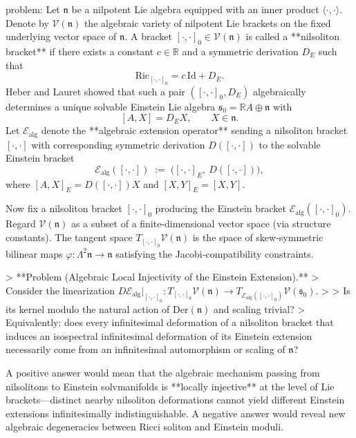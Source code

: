 problem:  
Let \( \mathfrak{n} \) be a nilpotent Lie algebra equipped with an inner product \( \langle \cdot,\cdot\rangle \).  
Denote by \( \mathcal{V}(\mathfrak{n}) \) the algebraic variety of nilpotent Lie brackets on the fixed underlying vector space of \( \mathfrak{n} \).  A bracket \( [\cdot,\cdot]_0 \in \mathcal{V}(\mathfrak{n}) \) is called a **nilsoliton bracket** if there exists a constant \( c\in\mathbb R \) and a symmetric derivation \(D_E\) such that
\[
\mathrm{Ric}_{[\cdot,\cdot]_0} = c\,\mathrm{Id} + D_E .
\]
Heber and Lauret showed that such a pair \(([\cdot,\cdot]_0, D_E)\) algebraically determines a unique solvable Einstein Lie algebra \( \mathfrak{s}_0 = \mathbb R A \oplus \mathfrak{n} \) with
\[
[A,X] = D_E X, \qquad X\in\mathfrak{n}.
\]
Let \( \mathcal{E}_{\mathrm{alg}} \) denote the **algebraic extension operator** sending a nilsoliton bracket \( [\cdot,\cdot] \) with corresponding symmetric derivation \(D([\cdot,\cdot])\) to the solvable Einstein bracket
\[
\mathcal{E}_{\mathrm{alg}}([\cdot,\cdot])\;:=\;\big([\cdot,\cdot]_E,\ D([\cdot,\cdot])\big),
\]
where \( [A,X]_E = D([\cdot,\cdot])X \) and \( [X,Y]_E = [X,Y] \).

Now fix a nilsoliton bracket \( [\cdot,\cdot]_0 \) producing the Einstein bracket \( \mathcal{E}_{\mathrm{alg}}([\cdot,\cdot]_0) \).  Regard \( \mathcal{V}(\mathfrak{n}) \) as a subset of a finite-dimensional vector space (via structure constants).  The tangent space \( T_{[\cdot,\cdot]_0}\mathcal{V}(\mathfrak{n}) \) is the space of skew‑symmetric bilinear maps \( \varphi:\Lambda^2\mathfrak{n}\to\mathfrak{n} \) satisfying the Jacobi‑compatibility constraints.

> **Problem (Algebraic Local Injectivity of the Einstein Extension).**  
> Consider the linearization \( D\mathcal{E}_{\mathrm{alg}}|_{[\cdot,\cdot]_0} : T_{[\cdot,\cdot]_0}\mathcal{V}(\mathfrak{n}) \to T_{\mathcal{E}_{\mathrm{alg}}([\cdot,\cdot]_0)}\mathcal{V}(\mathfrak{s}_0) \).  
>  
> Is its kernel modulo the natural action of \( \mathrm{Der}(\mathfrak{n}) \) and scaling trivial?  
> Equivalently: does every infinitesimal deformation of a nilsoliton bracket that induces an isospectral infinitesimal deformation of its Einstein extension necessarily come from an infinitesimal automorphism or scaling of \( \mathfrak{n} \)?  

A positive answer would mean that the algebraic mechanism passing from nilsolitons to Einstein solvmanifolds is **locally injective** at the level of Lie brackets—distinct nearby nilsoliton deformations cannot yield different Einstein extensions infinitesimally indistinguishable. A negative answer would reveal new algebraic degeneracies between Ricci soliton and Einstein moduli.

